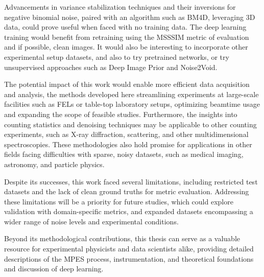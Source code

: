Advancements in variance stabilization techniques and their inversions for negative binomial noise, paired with an algorithm such as BM4D, leveraging 3D data, could prove useful when faced with no training data. The deep learning training would benefit from retraining using the \gls{MSSSIM} metric of evaluation and if possible, clean images. It would also be interesting to incorporate other experimental setup datasets, and also to try pretrained networks, or try unsupervised approaches such as Deep Image Prior and Noise2Void.

The potential impact of this work would enable more efficient data acquisition and analysis, the methods developed here streamlining experiments at large-scale facilities such as \glspl{FEL} or table-top laboratory setups, optimizing beamtime usage and expanding the scope of feasible studies. Furthermore, the insights into counting statistics and denoising techniques may be applicable to other counting experiments, such as X-ray diffraction, scattering, and other multidimensional spectroscopies. These methodologies also hold promise for applications in other fields facing difficulties with sparse, noisy datasets, such as medical imaging, astronomy, and particle physics.

Despite its successes, this work faced several limitations, including restricted test datasets and the lack of clean ground truths for metric evaluation. Addressing these limitations will be a priority for future studies, which could explore validation with domain-specific metrics, and expanded datasets encompassing a wider range of noise levels and experimental conditions. 

Beyond its methodological contributions, this thesis can serve as a valuable resource for experimental physicists and data scientists alike, providing detailed descriptions of the \gls{MPES} process, instrumentation, and theoretical foundations and discussion of deep learning.



